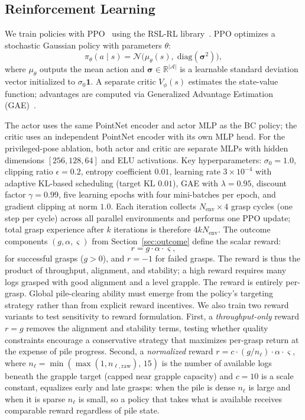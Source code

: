 \documentclass[letterpaper, 10 pt, conference]{ieeeconf}
\begin{document}
\subsection{Reinforcement Learning}
\label{sec:rl}
We train policies with PPO~\cite{schulman2017ppo} using the RSL-RL library~\cite{schwarke2025rslrl}.
PPO optimizes a stochastic Gaussian policy with parameters $\theta$:
\begin{equation}
    \pi_\theta(a \mid s) = \mathcal{N}\!\big(\mu_\theta(s),\;\mathrm{diag}(\bm{\sigma}^2)\big),
\end{equation}
where $\mu_\theta$ outputs the mean action and $\bm{\sigma} \in \mathbb{R}^{|\mathcal{A}|}$ is a learnable standard deviation vector initialized to $\sigma_0 \mathbf{1}$.
A separate critic $V_\phi(s)$ estimates the state-value function; advantages are computed via Generalized Advantage Estimation (GAE)~\cite{schulman2017ppo}.

The actor uses the same PointNet encoder and actor MLP as the BC policy; the critic uses an independent PointNet encoder with its own MLP head.
For the privileged-pose ablation, both actor and critic are separate MLPs with hidden dimensions $[256, 128, 64]$ and ELU activations.
Key hyperparameters: $\sigma_0 = 1.0$, clipping ratio $\epsilon=0.2$, entropy coefficient $0.01$, learning rate $3\times10^{-4}$ with adaptive KL-based scheduling (target KL $0.01$), GAE with $\lambda=0.95$, discount factor $\gamma = 0.99$, five learning epochs with four mini-batches per epoch, and gradient clipping at norm $1.0$.
Each iteration collects $N_{\text{env}} \times 4$ grasp cycles (one step per cycle) across all parallel environments and performs one PPO update; total grasp experience after $k$ iterations is therefore $4 k N_{\text{env}}$.
The outcome components $(g,\alpha,\varsigma)$ from Section~\ref{sec:outcome} define the scalar reward:
\label{eq:reward}
\begin{equation}
r = g \cdot \alpha \cdot \varsigma,
\end{equation}
for successful grasps ($g > 0$), and $r = -1$ for failed grasps.
The reward is thus the product of throughput, alignment, and stability; a high reward requires many logs grasped with good alignment and a level grapple.
The reward is entirely per-grasp.
Global pile-clearing ability must emerge from the policy's targeting strategy rather than from explicit reward incentives.
We also train two reward variants to test sensitivity to reward formulation.
First, a \emph{throughput-only} reward $r = g$ removes the alignment and stability terms, testing whether quality constraints encourage a conservative strategy that maximizes per-grasp return at the expense of pile progress.
Second, a \emph{normalized} reward $r = c \cdot (g/n_\ell) \cdot \alpha \cdot \varsigma$, where $n_\ell = \min(\max(1, n_{\ell,\mathrm{raw}}),\, 15)$ is the number of available logs beneath the grapple target (capped near grapple capacity) and $c = 10$ is a scale constant, equalizes early and late grasps: when the pile is dense $n_\ell$ is large and when it is sparse $n_\ell$ is small, so a policy that takes what is available receives comparable reward regardless of pile state.
\end{document}
